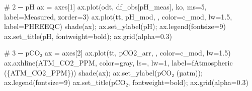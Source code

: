 \documentclass[
  letterpaper,
  DIV=11,
  numbers=noendperiod]{scrartcl}
\newenvironment{Shaded}{\begin{snugshade}}{\end{snugshade}}
\newcommand{\CommentTok}[1]{\textcolor[rgb]{0.37,0.37,0.37}{#1}}
\newcommand{\DecValTok}[1]{\textcolor[rgb]{0.68,0.00,0.00}{#1}}
\newcommand{\FloatTok}[1]{\textcolor[rgb]{0.68,0.00,0.00}{#1}}
\newcommand{\NormalTok}[1]{\textcolor[rgb]{0.00,0.23,0.31}{#1}}
\newcommand{\OperatorTok}[1]{\textcolor[rgb]{0.37,0.37,0.37}{#1}}
\newcommand{\SpecialCharTok}[1]{\textcolor[rgb]{0.37,0.37,0.37}{#1}}
\newcommand{\SpecialStringTok}[1]{\textcolor[rgb]{0.13,0.47,0.30}{#1}}
\newcommand{\StringTok}[1]{\textcolor[rgb]{0.13,0.47,0.30}{#1}}
\begin{document}
\begin{Shaded}
\begin{Highlighting}[]
\CommentTok{\# 2 ─ pH}
\NormalTok{ax }\OperatorTok{=}\NormalTok{ axes[}\DecValTok{1}\NormalTok{]}
\NormalTok{ax.plot(odt, df\_obs[}\StringTok{\textquotesingle{}pH\_meas\textquotesingle{}}\NormalTok{], }\StringTok{\textquotesingle{}ko\textquotesingle{}}\NormalTok{, ms}\OperatorTok{=}\DecValTok{5}\NormalTok{, label}\OperatorTok{=}\StringTok{\textquotesingle{}Measured\textquotesingle{}}\NormalTok{, zorder}\OperatorTok{=}\DecValTok{3}\NormalTok{)}
\NormalTok{ax.plot(tt, pH\_mod, }\StringTok{\textquotesingle{}{-}\textquotesingle{}}\NormalTok{, color}\OperatorTok{=}\NormalTok{c\_mod, lw}\OperatorTok{=}\FloatTok{1.5}\NormalTok{, label}\OperatorTok{=}\StringTok{\textquotesingle{}PHREEQC\textquotesingle{}}\NormalTok{)}
\NormalTok{shade(ax)}\OperatorTok{;}\NormalTok{ ax.set\_ylabel(}\StringTok{\textquotesingle{}pH\textquotesingle{}}\NormalTok{)}\OperatorTok{;}\NormalTok{ ax.legend(fontsize}\OperatorTok{=}\DecValTok{9}\NormalTok{)}
\NormalTok{ax.set\_title(}\StringTok{\textquotesingle{}pH\textquotesingle{}}\NormalTok{, fontweight}\OperatorTok{=}\StringTok{\textquotesingle{}bold\textquotesingle{}}\NormalTok{)}\OperatorTok{;}\NormalTok{ ax.grid(alpha}\OperatorTok{=}\FloatTok{0.3}\NormalTok{)}

\CommentTok{\# 3 ─ pCO₂}
\NormalTok{ax }\OperatorTok{=}\NormalTok{ axes[}\DecValTok{2}\NormalTok{]}
\NormalTok{ax.plot(tt, pCO2\_arr, }\StringTok{\textquotesingle{}{-}\textquotesingle{}}\NormalTok{, color}\OperatorTok{=}\NormalTok{c\_mod, lw}\OperatorTok{=}\FloatTok{1.5}\NormalTok{)}
\NormalTok{ax.axhline(ATM\_CO2\_PPM, color}\OperatorTok{=}\StringTok{\textquotesingle{}gray\textquotesingle{}}\NormalTok{, ls}\OperatorTok{=}\StringTok{\textquotesingle{}{-}{-}\textquotesingle{}}\NormalTok{, lw}\OperatorTok{=}\DecValTok{1}\NormalTok{,}
\NormalTok{           label}\OperatorTok{=}\SpecialStringTok{f\textquotesingle{}Atmospheric (}\SpecialCharTok{\{}\NormalTok{ATM\_CO2\_PPM}\SpecialCharTok{\}}\SpecialStringTok{)\textquotesingle{}}\NormalTok{)}
\NormalTok{shade(ax)}\OperatorTok{;}\NormalTok{ ax.set\_ylabel(}\StringTok{\textquotesingle{}pCO₂ (µatm)\textquotesingle{}}\NormalTok{)}\OperatorTok{;}\NormalTok{ ax.legend(fontsize}\OperatorTok{=}\DecValTok{9}\NormalTok{)}
\NormalTok{ax.set\_title(}\StringTok{\textquotesingle{}pCO₂\textquotesingle{}}\NormalTok{, fontweight}\OperatorTok{=}\StringTok{\textquotesingle{}bold\textquotesingle{}}\NormalTok{)}\OperatorTok{;}\NormalTok{ ax.grid(alpha}\OperatorTok{=}\FloatTok{0.3}\NormalTok{)}


\end{Highlighting}
\end{Shaded}
\end{document}
